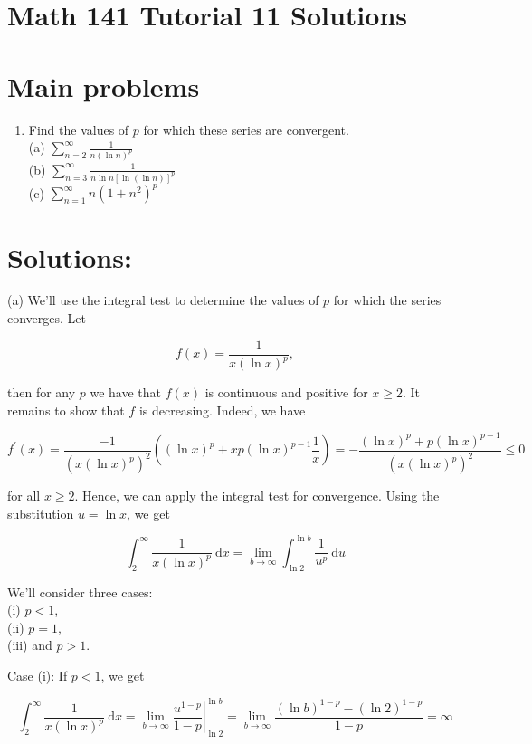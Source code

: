 \documentclass[10pt]{article}
\begin{document}
\section*{Math 141 Tutorial 11 Solutions}
\section*{Main problems}
\begin{enumerate}
  \item Find the values of $p$ for which these series are convergent.\\
(a) $\sum_{n=2}^{\infty} \frac{1}{n(\ln n)^{p}}$\\
(b) $\sum_{n=3}^{\infty} \frac{1}{n \ln n[\ln (\ln n)]^{p}}$\\
(c) $\sum_{n=1}^{\infty} n\left(1+n^{2}\right)^{p}$
\end{enumerate}

\section*{Solutions:}
(a) We'll use the integral test to determine the values of $p$ for which the series converges. Let

$$
f(x)=\frac{1}{x(\ln x)^{p}},
$$

then for any $p$ we have that $f(x)$ is continuous and positive for $x \geq 2$. It remains to show that $f$ is decreasing. Indeed, we have

$$
f^{\prime}(x)=\frac{-1}{\left(x(\ln x)^{p}\right)^{2}}\left((\ln x)^{p}+x p(\ln x)^{p-1} \frac{1}{x}\right)=-\frac{(\ln x)^{p}+p(\ln x)^{p-1}}{\left(x(\ln x)^{p}\right)^{2}} \leq 0
$$

for all $x \geq 2$. Hence, we can apply the integral test for convergence. Using the substitution $u=\ln x$, we get

$$
\int_{2}^{\infty} \frac{1}{x(\ln x)^{p}} \mathrm{~d} x=\lim _{b \rightarrow \infty} \int_{\ln 2}^{\ln b} \frac{1}{u^{p}} \mathrm{~d} u
$$

We'll consider three cases:\\
(i) $p<1$,\\
(ii) $p=1$,\\
(iii) and $p>1$.

Case (i): If $p<1$, we get

$$
\int_{2}^{\infty} \frac{1}{x(\ln x)^{p}} \mathrm{~d} x=\left.\lim _{b \rightarrow \infty} \frac{u^{1-p}}{1-p}\right|_{\ln 2} ^{\ln b}=\lim _{b \rightarrow \infty} \frac{(\ln b)^{1-p}-(\ln 2)^{1-p}}{1-p}=\infty
$$
\end{document}
